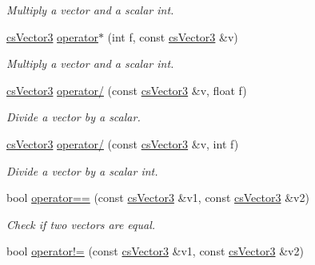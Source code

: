 \begin{DoxyCompactItemize}
\begin{DoxyCompactList}\small\item\em Multiply a vector and a scalar int. \end{DoxyCompactList}\item 
\hyperlink{classcsVector3}{cs\+Vector3} \hyperlink{classcsVector3_a34a0f8189f67eb601ba8a3862a31f493}{operator$\ast$} (int f, const \hyperlink{classcsVector3}{cs\+Vector3} \&v)\hypertarget{classcsVector3_a34a0f8189f67eb601ba8a3862a31f493}{}\label{classcsVector3_a34a0f8189f67eb601ba8a3862a31f493}

\begin{DoxyCompactList}\small\item\em Multiply a vector and a scalar int. \end{DoxyCompactList}\item 
\hyperlink{classcsVector3}{cs\+Vector3} \hyperlink{classcsVector3_a052b2559d5d577132492d1213bac4ce0}{operator/} (const \hyperlink{classcsVector3}{cs\+Vector3} \&v, float f)\hypertarget{classcsVector3_a052b2559d5d577132492d1213bac4ce0}{}\label{classcsVector3_a052b2559d5d577132492d1213bac4ce0}

\begin{DoxyCompactList}\small\item\em Divide a vector by a scalar. \end{DoxyCompactList}\item 
\hyperlink{classcsVector3}{cs\+Vector3} \hyperlink{classcsVector3_a7d8f52709a5520e2b9fa71ae9bdcc7fa}{operator/} (const \hyperlink{classcsVector3}{cs\+Vector3} \&v, int f)\hypertarget{classcsVector3_a7d8f52709a5520e2b9fa71ae9bdcc7fa}{}\label{classcsVector3_a7d8f52709a5520e2b9fa71ae9bdcc7fa}

\begin{DoxyCompactList}\small\item\em Divide a vector by a scalar int. \end{DoxyCompactList}\item 
bool \hyperlink{classcsVector3_a66e0e8c5f4adc5dc97d9101ed7d087b8}{operator==} (const \hyperlink{classcsVector3}{cs\+Vector3} \&v1, const \hyperlink{classcsVector3}{cs\+Vector3} \&v2)\hypertarget{classcsVector3_a66e0e8c5f4adc5dc97d9101ed7d087b8}{}\label{classcsVector3_a66e0e8c5f4adc5dc97d9101ed7d087b8}

\begin{DoxyCompactList}\small\item\em Check if two vectors are equal. \end{DoxyCompactList}\item 
bool \hyperlink{classcsVector3_a14effb8e6e631957c158846343cc362e}{operator!=} (const \hyperlink{classcsVector3}{cs\+Vector3} \&v1, const \hyperlink{classcsVector3}{cs\+Vector3} \&v2)\hypertarget{classcsVector3_a14effb8e6e631957c158846343cc362e}{}\label{classcsVector3_a14effb8e6e631957c158846343cc362e}


\end{DoxyCompactItemize}
